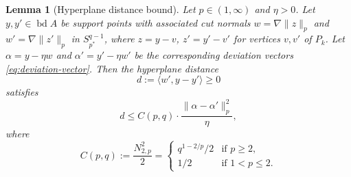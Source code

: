 \documentclass[11pt]{article}
\newtheorem{lemma}[theorem]{Lemma}
\newcommand{\pstar}{p^*}
\begin{document}
\begin{lemma}[Hyperplane distance bound]\label{lem:hyperplane-distance}
Let $p \in (1, \infty)$ and $\eta > 0$. Let $y, y' \in \operatorname{bd} A$ be support points with associated cut normals $w = \nabla\|z\|_p$ and $w' = \nabla\|z'\|_p$ in $S_{\pstar}^{q-1}$, where $z = y - v$, $z' = y' - v'$ for vertices $v, v'$ of $P_k$. Let $\alpha = y - \eta w$ and $\alpha' = y' - \eta w'$ be the corresponding deviation vectors \eqref{eq:deviation-vector}. Then the hyperplane distance
\[
d := \langle w', y - y' \rangle \ge 0
\]
satisfies
\begin{equation}\label{eq:hyperplane-distance}
d \le C(p,q) \cdot \frac{\|\alpha - \alpha'\|_p^2}{\eta},
\end{equation}
where
\[
C(p,q) := \frac{N_{2,p}^2}{2} = \begin{cases} q^{1-2/p}/2 & \text{if } p \ge 2, \\[4pt] 1/2 & \text{if } 1 < p \le 2. \end{cases}
\]
\end{lemma}
\end{document}

